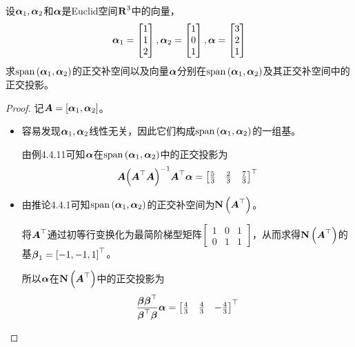 \begin{problem}
设\(\boldsymbol{\alpha}_1,\boldsymbol{\alpha}_2\)和\(\boldsymbol{\alpha}\)是Euclid空间\(\boldsymbol{\mathrm{R}}^3\)中的向量，
\begin{equation*}
    \boldsymbol{\alpha}_1=\begin{bmatrix}1\\1\\2\end{bmatrix},
    \boldsymbol{\alpha}_2=\begin{bmatrix}1\\0\\1\end{bmatrix},
    \boldsymbol{\alpha}=\begin{bmatrix}3\\2\\1\end{bmatrix}
\end{equation*}
求\(\mathrm{span}\left( \boldsymbol{\alpha}_1,\boldsymbol{\alpha}_2 \right)\)的正交补空间以及向量\(\boldsymbol{\alpha}\)分别在\(\mathrm{span}\left( \boldsymbol{\alpha}_1,\boldsymbol{\alpha}_2 \right)\)及其正交补空间中的正交投影。
\end{problem}
\begin{proof}
    记\(\boldsymbol{A}=\left[ \boldsymbol{\alpha}_1,\boldsymbol{\alpha}_2 \right]\)。
    \begin{itemize}
        \item {
              容易发现\(\boldsymbol{\alpha}_1,\boldsymbol{\alpha}_2\)线性无关，因此它们构成\(\mathrm{span}\left( \boldsymbol{\alpha}_1,\boldsymbol{\alpha}_2 \right)\)的一组基。

              由例4.4.11可知\(\boldsymbol{\alpha}\)在\(\mathrm{span}\left( \boldsymbol{\alpha}_1,\boldsymbol{\alpha}_2 \right)\)中的正交投影为
              \begin{equation*}
                  \boldsymbol{A}{\left( \boldsymbol{A}^\top\boldsymbol{A} \right)}^{-1}\boldsymbol{A}^\top\boldsymbol{\alpha}=\begin{bmatrix}\frac{5}{3}&\frac{2}{3}&\frac{7}{3}\end{bmatrix}^\top
              \end{equation*}
              }
        \item {
              由推论4.4.1可知\(\mathrm{span}\left( \boldsymbol{\alpha}_1,\boldsymbol{\alpha}_2 \right)\)的正交补空间为\(\boldsymbol{\mathrm{N}}\left( \boldsymbol{A}^\top \right)\)。

              将\(\boldsymbol{A}^\top\)通过初等行变换化为最简阶梯型矩阵\(\begin{bmatrix}1 & 0 & 1 \\0 & 1 & 1\end{bmatrix}\)，从而求得\(\boldsymbol{\mathrm{N}}\left( \boldsymbol{A}^\top \right)\)的基\(\boldsymbol{\beta}_1=\left[ -1,-1,1 \right]^\top\)。

              所以\(\boldsymbol{\alpha}\)在\(\boldsymbol{\mathrm{N}}\left( \boldsymbol{A}^\top \right)\)中的正交投影为
              \begin{equation*}
                  \frac{\boldsymbol{\beta}\boldsymbol{\beta}^\top}{\boldsymbol{\beta}^\top\boldsymbol{\beta}}\boldsymbol{\alpha}=\begin{bmatrix}\frac{4}{3}&\frac{4}{3}&-\frac{4}{3}\end{bmatrix}^\top
              \end{equation*}
              }
    \end{itemize}
\end{proof}

